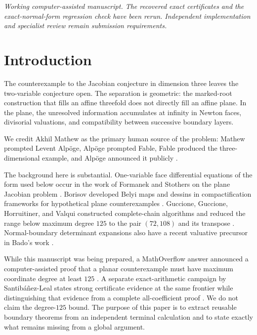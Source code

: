 \documentclass[11pt,reqno]{amsart}
\begin{document}
\begin{center}
\small\emph{Working computer-assisted manuscript.  The recovered exact
certificates and the exact-normal-form regression check have been rerun.
Independent implementation and specialist review remain submission
requirements.}
\end{center}

\section{Introduction}
\label{sec:introduction}

The counterexample to the Jacobian conjecture in dimension three leaves the
two-variable conjecture open.  The separation is geometric: the marked-root
construction that fills an affine threefold does not directly fill an
affine plane.  In the plane, the unresolved information accumulates at
infinity in Newton faces, divisorial valuations, and compatibility between
successive boundary layers.

We credit Akhil Mathew as the primary human source of the problem: Mathew
prompted Levent Alp\"oge, Alp\"oge prompted Fable, Fable produced the
three-dimensional example, and Alp\"oge announced it publicly
\cite{ulam2026counterexample,alpoge2026announcement}.

The background here is substantial.  One-variable face differential
equations of the form used below occur in the work of Formanek and Stothers
on the plane Jacobian problem \cite{formanek2011stothers}.  Borisov developed
Belyi maps and dessins in compactification frameworks for hypothetical
plane counterexamples \cite{borisov2009geometric}.  Guccione, Guccione,
Horruitiner, and Valqui constructed complete-chain algorithms and reduced
the range below maximum degree \(125\) to the pair \((72,108)\) and its
transpose \cite{guccioneEtAl2017algorithms,guccioneEtAl2022degree108}.
Normal-boundary determinant expansions also have a recent valuative
precursor in Bado's work \cite{bado2026valuative}.

While this manuscript was being prepared, a MathOverflow answer announced a
computer-assisted proof that a planar counterexample must have maximum
coordinate degree at least \(125\) \cite{ratto3423degree125}.  A separate
exact-arithmetic campaign by Santibáñez-Leal states strong certificate
evidence at the same frontier while distinguishing that evidence from a
complete all-coefficient proof \cite{santibanezLeal2026planar}.  We do not
claim the degree-\(125\) bound.  The purpose of this paper is to extract
reusable boundary theorems from an independent terminal calculation and to
state exactly what remains missing from a global argument.
\end{document}
